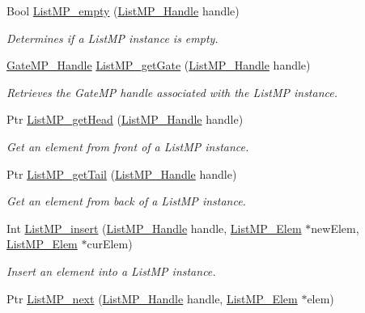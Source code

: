 \begin{DoxyCompactItemize}
Bool \hyperlink{_list_m_p_8h_a87f3489e92331dd7e3a2ca7315d6ae88}{List\-M\-P\-\_\-empty} (\hyperlink{_list_m_p_8h_abf5a0381ce9dab133382015abaf7fe6b}{List\-M\-P\-\_\-\-Handle} handle)
\begin{DoxyCompactList}\small\item\em Determines if a List\-M\-P instance is empty. \end{DoxyCompactList}\item 
\hyperlink{_gate_m_p_8h_ad5bb259f928a14e98d973334bc60ebb3}{Gate\-M\-P\-\_\-\-Handle} \hyperlink{_list_m_p_8h_abcbcfa3aa97f94f1559c94e3de56a445}{List\-M\-P\-\_\-get\-Gate} (\hyperlink{_list_m_p_8h_abf5a0381ce9dab133382015abaf7fe6b}{List\-M\-P\-\_\-\-Handle} handle)
\begin{DoxyCompactList}\small\item\em Retrieves the Gate\-M\-P handle associated with the List\-M\-P instance. \end{DoxyCompactList}\item 
Ptr \hyperlink{_list_m_p_8h_a3f94c683617f51b4e9de75d87c729524}{List\-M\-P\-\_\-get\-Head} (\hyperlink{_list_m_p_8h_abf5a0381ce9dab133382015abaf7fe6b}{List\-M\-P\-\_\-\-Handle} handle)
\begin{DoxyCompactList}\small\item\em Get an element from front of a List\-M\-P instance. \end{DoxyCompactList}\item 
Ptr \hyperlink{_list_m_p_8h_a75ac818a89cae66a10fb200f691c3949}{List\-M\-P\-\_\-get\-Tail} (\hyperlink{_list_m_p_8h_abf5a0381ce9dab133382015abaf7fe6b}{List\-M\-P\-\_\-\-Handle} handle)
\begin{DoxyCompactList}\small\item\em Get an element from back of a List\-M\-P instance. \end{DoxyCompactList}\item 
Int \hyperlink{_list_m_p_8h_a202b294a05f5be8b909c38e592978e8b}{List\-M\-P\-\_\-insert} (\hyperlink{_list_m_p_8h_abf5a0381ce9dab133382015abaf7fe6b}{List\-M\-P\-\_\-\-Handle} handle, \hyperlink{struct_list_m_p___elem}{List\-M\-P\-\_\-\-Elem} $\ast$new\-Elem, \hyperlink{struct_list_m_p___elem}{List\-M\-P\-\_\-\-Elem} $\ast$cur\-Elem)
\begin{DoxyCompactList}\small\item\em Insert an element into a List\-M\-P instance. \end{DoxyCompactList}\item 
Ptr \hyperlink{_list_m_p_8h_a1c9b826d5b17a55a8ddbe231db1b8f36}{List\-M\-P\-\_\-next} (\hyperlink{_list_m_p_8h_abf5a0381ce9dab133382015abaf7fe6b}{List\-M\-P\-\_\-\-Handle} handle, \hyperlink{struct_list_m_p___elem}{List\-M\-P\-\_\-\-Elem} $\ast$elem)

\end{DoxyCompactItemize}
